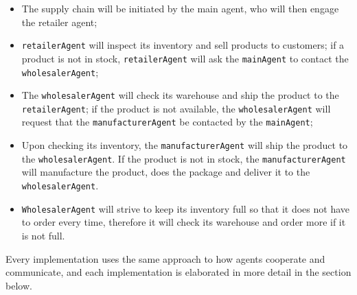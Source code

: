 \begin{itemize}
    \item The supply chain will be initiated by the main agent, who will then engage the retailer agent;
    
    \vspace{.5cm}
    
    \item \texttt{retailerAgent} will inspect its inventory and sell products to customers; if a product is not in stock, \texttt{retailerAgent} will ask the \texttt{mainAgent} to contact the \texttt{wholesalerAgent};
    
    \vspace{.5cm}
    
    \item The \texttt{wholesalerAgent} will check its warehouse and ship the product to the \texttt{retailerAgent}; if the product is not available, the \texttt{wholesalerAgent} will request that the \texttt{manufacturerAgent} be contacted by the \texttt{mainAgent};
    
    \vspace{.5cm}
    
    \item Upon checking its inventory, the \texttt{manufacturerAgent} will ship the product to the \texttt{wholesalerAgent}. If the product is not in stock, the \texttt{manufacturerAgent} will manufacture the product, does the package and deliver it to the \texttt{wholesalerAgent}.

    \vspace{.5cm}
    
    \item \texttt{WholesalerAgent} will strive to keep its inventory full so that it does not have to order every time, therefore it will check its warehouse and order more if it is not full.
    
    \vspace{.5cm}
    
\end{itemize}

Every implementation uses the same approach to how agents cooperate and communicate, and each implementation is elaborated in more detail in the section below.

